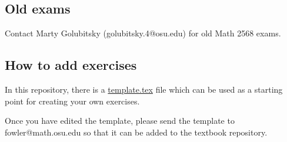 \documentclass{article}
\begin{document}
\subsection{Old exams}\label{old-exams}

Contact Marty Golubitsky (golubitsky.4@osu.edu) for old Math 2568 exams.

\subsection{How to add exercises}\label{how-to-add-exercises}

In this repository, there is a
\href{https://github.com/mooculus/laode/blob/master/howToContribute/template.tex}{template.tex}
file which can be used as a starting point for creating your own
exercises.

Once you have edited the template, please send the template to
fowler@math.osu.edu so that it can be added to the textbook repository.
\end{document}
